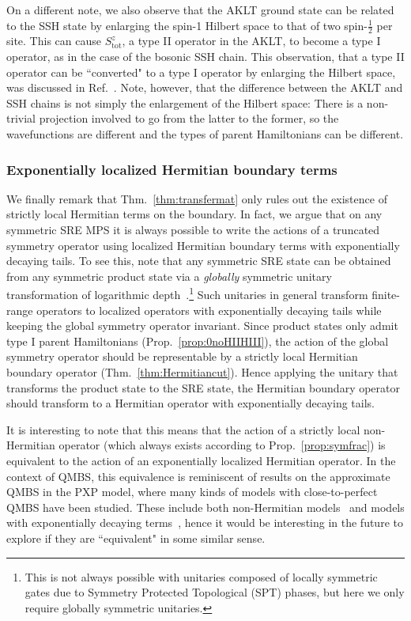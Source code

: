 \documentclass[prx,letterpaper,aps,superscriptaddress,floatfix,twocolumn,nofootinbib]{revtex4-2}
\theoremstyle{definition}
\newcommand{\tot}{\text{tot}}
\begin{document}
%
On a different note, we also observe that the AKLT ground state can be related to the SSH state by enlarging the spin-1 Hilbert space to that of two spin-$\frac{1}{2}$ per site.
%
This can cause $S^z_{\tot}$, a type II operator in the AKLT, to become a type I operator, as in the case of the bosonic SSH chain.
%
This observation, that a type II operator can be ``converted" to a type I operator by enlarging the Hilbert space, was discussed in Ref.~\cite{PhysRevB.108.054412}.
%
Note, however, that the difference between the AKLT and SSH chains is not simply the enlargement of the Hilbert space:
%
There is a non-trivial projection involved to go from the latter to the former, so the wavefunctions are different and the types of parent Hamiltonians can be different.
%

%
\subsubsection{Exponentially localized Hermitian boundary terms}\label{subsubsec:explocherm}
%
We finally remark that Thm.~\ref{thm:transfermat} only rules out the existence of strictly local Hermitian terms on the boundary.
%
In fact, we argue that on any symmetric SRE MPS it is always possible to write the actions of a truncated symmetry operator using localized Hermitian boundary terms with exponentially decaying tails. 
%
To see this, note that any symmetric SRE state can be obtained from any symmetric product state via a \textit{globally} symmetric unitary transformation of logarithmic depth~\cite{malz2024preparation}.\footnote{This is not always possible with unitaries composed of locally symmetric gates due to Symmetry Protected Topological (SPT) phases, but here we only require globally symmetric unitaries.}
%
Such unitaries in general transform finite-range operators to localized operators with exponentially decaying tails while keeping the global symmetry operator invariant. 
%
Since product states only admit type I parent Hamiltonians (Prop.~\ref{prop:0noHIIHIII}), the action of the global symmetry operator should be representable by a strictly local Hermitian boundary operator (Thm.~\ref{thm:Hermitiancut}). 
%
Hence applying the unitary that transforms the product state to the SRE state, the Hermitian boundary operator should transform to a Hermitian operator with exponentially decaying tails.
%

%
It is interesting to note that this means that the action of a strictly local non-Hermitian operator (which always exists according to Prop.~\ref{prop:symfrac}) is equivalent to the action of an exponentially localized Hermitian operator. 
%
In the context of QMBS, this equivalence is reminiscent of results on the approximate QMBS in the PXP model, where many kinds of models with close-to-perfect QMBS have been studied. 
%
These include both non-Hermitian models~\cite{Omiya_2023quantum} and models with exponentially decaying terms~\cite{Choi_2019}, hence it would be interesting in the future to explore if they are ``equivalent" in some similar sense.
%
\end{document}
